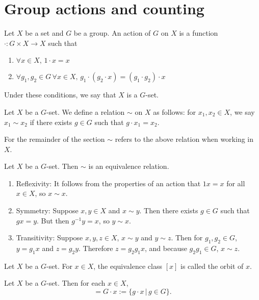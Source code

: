 \documentclass{article}
\begin{document}
\section{Group actions and counting}
\begin{defi}[Action]
	Let \(X\) be a set and \(G\) be a group. An action of \(G\) on \(X\) is a function \(\cdot:G\times X\rightarrow X\) such that
	\begin{enumerate}
		\item\(\forall x\in X,\, 1\cdot x=x\)
		\item\(\forall g_1,g_2\in G\,\forall x\in X,\,g_1\cdot(g_2\cdot x)=(g_1\cdot g_2)\cdot x\)
	\end{enumerate}
	Under these conditions, we say that \(X\) is a \(G\)-set.
\end{defi}
\begin{defi}
Let \(X\) be a \(G\)-set. We define a relation \(\sim\) on \(X\) as follows: for \(x_1,x_2\in X\), we say \(x_1\sim x_2\) if there exists \(g\in G\) such that \(g\cdot x_1=x_2\).
\end{defi}
\begin{rema}
	For the remainder of the section \(\sim\) refers to the above relation when working in \(X\).
\end{rema}
\begin{thm}
	Let \(X\) be a \(G\)-set. Then \(\sim\) is an equivalence relation.
	\begin{IEEEproof}
		\begin{enumerate}
			\item Reflexivity: It follows from the properties of an action that \(1x=x\) for all \(x\in X\), so \(x\sim x\).
			\item Symmetry: Suppose \(x,y\in X\) and \(x\sim y\). Then there exists \(g\in G\) such that \(gx=y\). But then \(g^{-1}y=x\), so \(y\sim x\).
			\item Transitivity: Suppose \(x,y,z\in X\), \(x\sim y\) and \(y\sim z\). Then for \(g_1,g_2\in G\), \(y=g_1x\) and \(z=g_2y\). Therefore \(z=g_2g_1x\), and because \(g_2g_1\in G\), \(x\sim z\).
		\end{enumerate}
	\end{IEEEproof}
\end{thm}
\begin{defi}[Orbit]
	Let \(X\) be a \(G\)-set. For \(x\in X\), the equivalence class \([x]\) is called the orbit of \(x\).
\end{defi}
\begin{rema}
	Let \(X\) be a \(G\)-set. Then for each \(x\in X\),
	\begin{equation*}
		[x]=G\cdot x:=\{g\cdot x\,|\,g\in G\}.
	\end{equation*}
\end{rema}
\end{document}
